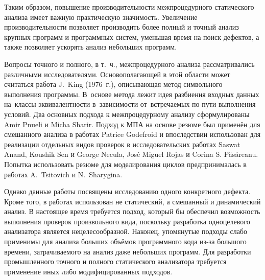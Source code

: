 
Таким образом, повышение производительности межпроцедурного статического анализа имеет важную практическую значимость. Увеличение производительности позволяет производить более полный и точный анализ крупных программ и программных систем, уменьшая время на поиск дефектов, а также позволяет ускорять анализ небольших программ.

Вопросы точного и полного, в т.~ч., межпроцедурного анализа рассматривались различными исследователями. Основополагающей в этой области может считаться работа J.~King (1976~г.), описывающая метод символьного выполнения программы. В~основе метода лежит идея разбиения входных данных на~классы эквивалентности в~зависимости от~встречаемых по пути выполнения условий. Два основных подхода к межпроцедурному анализу сформулированы Amir Pnueli и Micha Sharir. Подход к МПА на основе резюме был применён для смешанного анализа в работах Patrice Godefroid и впоследствии использован для реализации отдельных видов проверок в исследовательских работах Saswat Anand, Koushik Sen и George Necula, Jos\'{e} Miguel Rojas и Corina S. P\u{a}s\u{a}reanu. Попытка использовать резюме для моделирования циклов предпринималась в работах A.~Tsitovich и N.~Sharygina.

Однако данные работы посвящены исследованию одного конкретного дефекта. Кроме того, в работах использован не статический, а смешанный и динамический анализ. В настоящее время требуется подход, который бы обеспечил возможность выполнения проверок произвольного вида, поскольку разработка одноцелевого анализатора является нецелесообразной. Наконец, упомянутые подходы слабо применимы для анализа больших объёмов программного кода из-за большого времени, затрачиваемого на анализ даже небольших программ. Для разработки промышленного точного и полного статического анализатора требуется применение иных либо модифицированных подходов.

